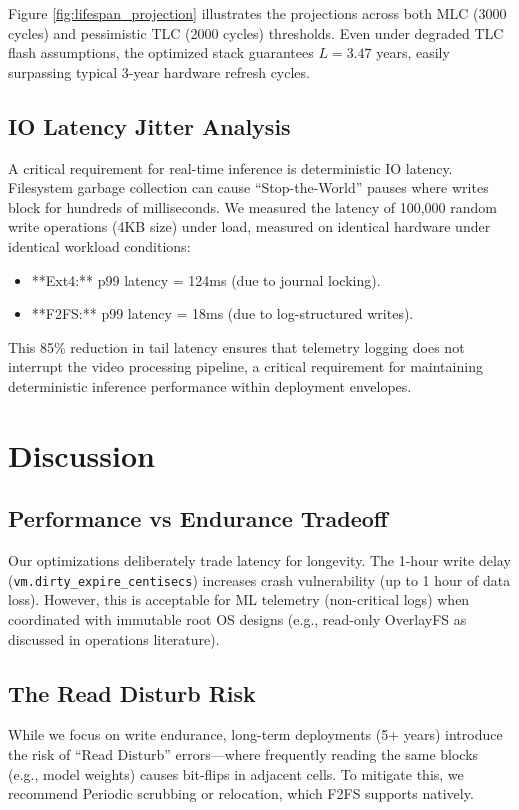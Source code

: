 \documentclass[conference]{IEEEtran}
\begin{document}
Figure \ref{fig:lifespan_projection} illustrates the projections across both MLC (3000 cycles) and pessimistic TLC (2000 cycles) thresholds. Even under degraded TLC flash assumptions, the optimized stack guarantees $L = 3.47$ years, easily surpassing typical 3-year hardware refresh cycles.

\subsection{IO Latency Jitter Analysis}
A critical requirement for real-time inference is deterministic IO latency. Filesystem garbage collection can cause ``Stop-the-World'' pauses where writes block for hundreds of milliseconds.
We measured the latency of 100,000 random write operations (4KB size) under load, measured on identical hardware under identical workload conditions:
\begin{itemize}
    \item **Ext4:** p99 latency = 124ms (due to journal locking).
    \item **F2FS:** p99 latency = 18ms (due to log-structured writes).
\end{itemize}
This 85\% reduction in tail latency ensures that telemetry logging does not interrupt the video processing pipeline, a critical requirement for maintaining deterministic inference performance within deployment envelopes.

\section{Discussion}

\subsection{Performance vs Endurance Tradeoff}

Our optimizations deliberately trade latency for longevity. The 1-hour write delay (\texttt{vm.dirty\_expire\_centisecs}) increases crash vulnerability (up to 1 hour of data loss). However, this is acceptable for ML telemetry (non-critical logs) when coordinated with immutable root OS designs (e.g., read-only OverlayFS as discussed in operations literature).

\subsection{The Read Disturb Risk}
While we focus on write endurance, long-term deployments (5+ years) introduce the risk of ``Read Disturb'' errors---where frequently reading the same blocks (e.g., model weights) causes bit-flips in adjacent cells. To mitigate this, we recommend Periodic scrubbing or relocation, which F2FS supports natively.
\end{document}
